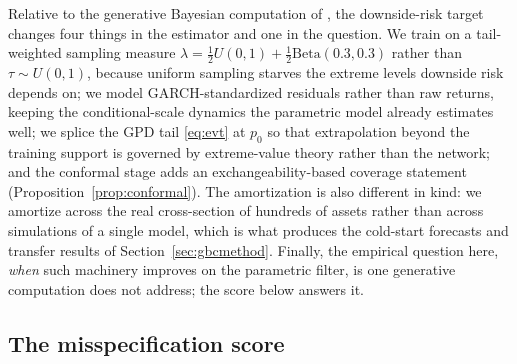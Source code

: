 \documentclass[11pt]{article}
\theoremstyle{remark}
\begin{document}
Relative to the generative Bayesian computation of
\citet{polson2023gbc}, the downside-risk target changes four things in
the estimator and one in the question. We train on a tail-weighted
sampling measure $\lambda = \tfrac12 U(0,1) + \tfrac12
\mathrm{Beta}(0.3,0.3)$ rather than $\tau\sim U(0,1)$, because
uniform sampling starves the extreme levels downside risk depends on;
we model GARCH-standardized residuals rather than raw returns, keeping
the conditional-scale dynamics the parametric model already estimates
well; we splice the GPD tail \eqref{eq:evt} at $p_0$ so that
extrapolation beyond the training support is governed by extreme-value
theory rather than the network; and the conformal stage adds an
exchangeability-based coverage statement
(Proposition~\ref{prop:conformal}). The amortization is also different
in kind: we amortize across the real cross-section of hundreds of
assets rather than across simulations of a single model, which is what
produces the cold-start forecasts and transfer results of
Section~\ref{sec:gbcmethod}. Finally, the empirical question here,
\emph{when} such machinery improves on the parametric filter, is one
generative computation does not address; the score below answers
it.

\subsection{The misspecification score}\label{sec:score}
\end{document}
